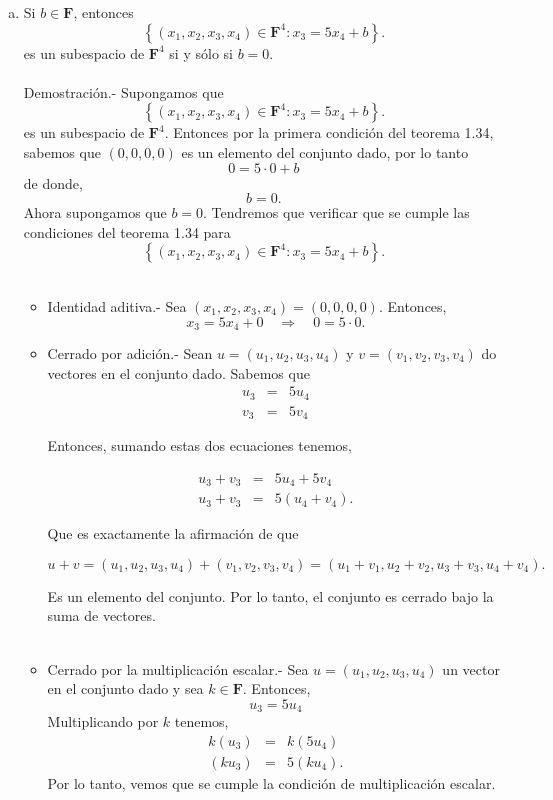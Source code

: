 \begin{enumerate}[\bfseries 1.]
\begin{enumerate}[(a)]
	    \item Si $b\in \textbf{F}$, entonces
	    $$\left\{(x_1,x_2,x_3,x_4)\in \textbf{F}^4 : x_3 = 5x_4+b\right\}.$$
	    es un subespacio de $\textbf{F}^4$ si y sólo si $b=0$.\\\\
		Demostración.-\; Supongamos que 
		$$\left\{(x_1,x_2,x_3,x_4)\in \textbf{F}^4 : x_3 = 5x_4+b\right\}.$$
		es un subespacio de $\textbf{F}^4$. Entonces por la primera condición del teorema 1.34, sabemos que $(0,0,0,0)$ es un elemento del conjunto dado, por lo tanto
		$$0=5\cdot 0 + b$$
		de donde,
		$$b=0.$$
		Ahora supongamos que $b=0$. Tendremos que verificar que se cumple las condiciones del teorema 1.34 para 
		$$\left\{(x_1,x_2,x_3,x_4)\in \textbf{F}^4 : x_3 = 5x_4+b\right\}.$$\\

		\begin{itemize}
		    \item Identidad aditiva.-\; Sea $(x_1,x_2,x_3,x_4)=(0,0,0,0)$. Entonces,
			$$x_3=5x_4+0 \quad \Rightarrow \quad 0=5\cdot 0.$$

		    \item Cerrado por adición.-\; Sean $u=(u_1,u_2,u_3,u_4)$ y $v=(v_1,v_2,v_3,v_4)$ do vectores en el conjunto dado. Sabemos que 
			$$
			\begin{array}{rcl}
			    u_3 &=& 5u_4 \\
			    v_3 &=& 5v_4
			\end{array}
			$$

			Entonces, sumando estas dos ecuaciones tenemos,

			$$
			\begin{array}{rcl}
			    u_3+v_3 &=& 5u_4+5v_4 \\
			    u_3+v_3 &=& 5(u_4+v_4).
			\end{array}
			$$

			Que es exactamente la afirmación de que

			$$u+v=(u_1,u_2,u_3,u_4)+(v_1,v_2,v_3,v_4)=(u_1+v_1,u_2+v_2,u_3+v_3,u_4+v_4).$$

			Es un elemento del conjunto. Por lo tanto, el conjunto es cerrado bajo la suma de vectores.\\\\

		    \item Cerrado por la multiplicación escalar.-\; Sea $u=(u_1,u_2,u_3,u_4)$ un vector en el conjunto dado y sea $k\in \textbf{F}$. Entonces, 
			$$u_3=5u_4$$
			Multiplicando por $k$ tenemos,
			$$
			\begin{array}{rcl}
			    k(u_3) &=& k(5u_4)\\
			    (ku_3) &=& 5(ku_4).
			\end{array}
			$$
			Por lo tanto, vemos que se cumple la condición de multiplicación escalar.\\\\


\end{itemize}
\end{enumerate}
\end{enumerate}

